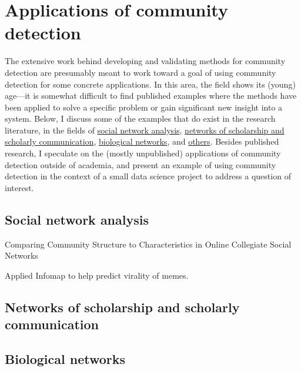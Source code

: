 \section{Applications of community
detection}\label{applications-of-community-detection}

The extensive work behind developing and validating methods for
community detection are presumably meant to work toward a goal of using
community detection for some concrete applications. In this area, the
field shows its (young) age---it is somewhat difficult to find published
examples where the methods have been applied to solve a specific problem
or gain significant new insight into a system. Below, I discuss some of
the examples that do exist in the research literature, in the fields of
\protect\hyperlink{social-network-analysis}{social network analysis},
\protect\hyperlink{networks-of-scholarship-and-scholarly-communication}{networks
of scholarship and scholarly communication},
\protect\hyperlink{biological-networks}{biological networks}, and
\protect\hyperlink{other-research}{others}. Besides published research,
I speculate on the (mostly unpublished) applications of community
detection outside of academia, and present an example of using community
detection in the context of a small data science project to address a
question of interest.

\hypertarget{social-network-analysis}{\subsection{Social network
analysis}\label{social-network-analysis}}

\autocite{traud_comparing_2011} Comparing Community Structure to
Characteristics in Online Collegiate Social Networks

\autocite{weng_virality_2013} Applied Infomap to help predict virality
of memes.

\hypertarget{networks-of-scholarship-and-scholarly-communication}{\subsection{Networks
of scholarship and scholarly
communication}\label{networks-of-scholarship-and-scholarly-communication}}

\hypertarget{biological-networks}{\subsection{Biological
networks}\label{biological-networks}}

